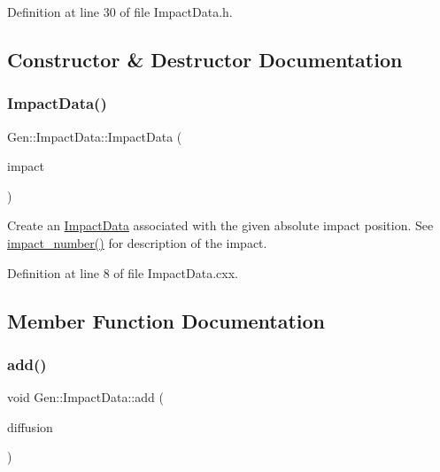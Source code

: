 Definition at line 30 of file Impact\+Data.\+h.



\subsection{Constructor \& Destructor Documentation}
\mbox{\label{class_wire_cell_1_1_gen_1_1_impact_data_a7e5a8376b65210d695b42d0cd587372f}} 
\subsubsection{\texorpdfstring{Impact\+Data()}{ImpactData()}}
{\footnotesize\ttfamily Gen\+::\+Impact\+Data\+::\+Impact\+Data (\begin{DoxyParamCaption}\item[{int}]{impact }\end{DoxyParamCaption})}

Create an \hyperlink{class_wire_cell_1_1_gen_1_1_impact_data}{Impact\+Data} associated with the given absolute impact position. See \hyperlink{class_wire_cell_1_1_gen_1_1_impact_data_a00db275ffb82f82831016b7ebaaed6e3}{impact\+\_\+number()} for description of the impact. 

Definition at line 8 of file Impact\+Data.\+cxx.



\subsection{Member Function Documentation}
\mbox{\label{class_wire_cell_1_1_gen_1_1_impact_data_ac43cc32d2ea372cfc6807a72774493ec}} 
\subsubsection{\texorpdfstring{add()}{add()}}
{\footnotesize\ttfamily void Gen\+::\+Impact\+Data\+::add (\begin{DoxyParamCaption}\item[{\hyperlink{class_wire_cell_1_1_gen_1_1_gaussian_diffusion_ac7fce7070c18877fa61abc26ad410ce9}{Gaussian\+Diffusion\+::pointer}}]{diffusion }\end{DoxyParamCaption})}

